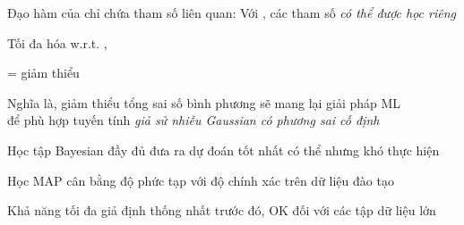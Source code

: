 \documentclass{article}
\begin{document}
\begin{huge}

Đạo hàm của  chỉ chứa tham số liên quan:
\mat{\[\begin{array}{rclcl}
\displaystyle \frac{\partial L}{\partial\theta} &=& \displaystyle \frac{c}{\theta} - \displaystyle\frac{\ell}{1-\theta} = 0                  & \qquad \implies & \theta = \displaystyle \frac{c}{c+\ell} 
\end{array}\]}%
\mat{\[\begin{array}{rclcl}
\displaystyle \frac{\partial L}{\partial\theta_1} &=& \displaystyle\frac{r_c}{\theta_1} - \displaystyle\frac{g_c}{1-\theta_1} = 0           & \qquad \implies & \theta_1 = \displaystyle\frac{r_c}{r_c+g_c} 
\end{array}\]}%
\mat{\[\begin{array}{rclcl}
\displaystyle \frac{\partial L}{\partial\theta_2} &=& \displaystyle\frac{r_{\ell}}{\theta_2} - \displaystyle\frac{g_{\ell}}{1-\theta_2} = 0 & \qquad \implies & \theta_2 = \displaystyle\frac{r_{\ell}}{r_{\ell}+g_{\ell}}
\end{array}\]}%
Với , các tham số \emph{ có thể được học riêng }






Tối đa hóa  w.r.t. , 

= giảm thiểu 

Nghĩa là, giảm thiểu tổng sai số bình phương sẽ mang lại giải pháp ML\\
để phù hợp tuyến tính \emph{giả sử nhiễu Gaussian có phương sai cố định }




Học tập Bayesian đầy đủ đưa ra dự đoán tốt nhất có thể nhưng khó thực hiện

Học MAP cân bằng độ phức tạp với độ chính xác trên dữ liệu đào tạo 

Khả năng tối đa giả định thống nhất trước đó, OK đối với các tập dữ liệu lớn


\end{huge}
\end{document}
